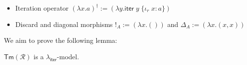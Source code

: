 \documentclass[acmsmall,screen,anonymous,review]{acmart}
\newcommand{\mc}[1]{\ensuremath{\mathcal{#1}}}
\newcommand{\ms}[1]{\ensuremath{\mathsf{#1}}}
\newcommand{\lto}{:}
\newcommand{\linl}[1]{\iota_l\;{#1}}
\newcommand{\linr}[1]{\iota_r\;{#1}}
\newcommand{\caseexpr}[5]{\ms{case}\;#1\;\{\linl{#2} \lto #3, \linr{#4} \lto #5\}}
\newcommand{\liter}[3]{\ms{iter}\;#1\;\{ \linr{#2} \lto #3 \}}
\newcommand{\tmor}[1]{{!}_{#1}}
\newcommand{\dmor}[1]{{\Delta}_{#1}}
\newcommand{\subiterexp}{\texorpdfstring{\(\lambda_{\ms{iter}}\)}{lambda-iter}}
\begin{document}
\begin{itemize}
\begin{gather*}
                          {(z_l, z_r)}{(z_l, \linr{z_r})}) \\
    \delta^{-1} := (\lambda (x_l, x_r). \caseexpr{x_r}{y}{\linl{(x_l, y)}}{z}{\linr{(x_r, z)}})
  \end{gather*}
  In particular, this means that we have
  \begin{align*}
    (\lambda x . a) ; [(\lambda y . b), (\lambda z . c)]
      &= (\lambda x . \caseexpr{a}{y}{b}{z}{c})
      \\
    (\lambda x . a) + (\lambda y . b) &= (\lambda z. \caseexpr{z}{x}{\linl{a}}{y}{\linr{b}})
      \\
    (\lambda x . a) ; (\lambda y . b) + (\lambda z . c)
      &= (\lambda x . \caseexpr{a}{y}{\linl{b}}{z}{\linr{c}})
  \end{align*}
  \item Iteration operator
  $
    (\lambda x. a)^\dagger := (\lambda y. \liter{y}{x}{a})
  $
  \item Discard and diagonal morphisms $\tmor{A} := (\lambda x. ())$ and $\dmor{A} := (\lambda x.
  (x, x))$
\end{itemize}
We aim to prove the following lemma:
\begin{lemma}
  $\ms{Tm}(\mc{R})$ is a \subiterexp{}-model.
\end{lemma}
\end{document}

